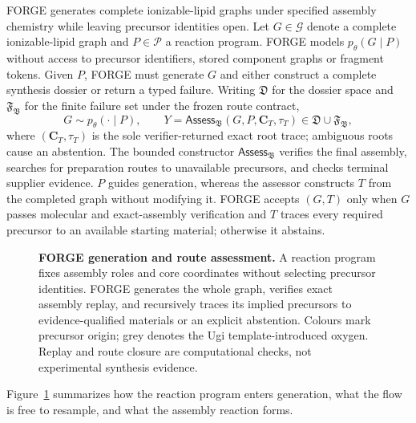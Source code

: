 \documentclass{article}
\begin{document}
FORGE generates complete ionizable-lipid graphs under specified assembly chemistry while leaving
precursor identities open. Let $G\in\mathcal{G}$ denote a complete ionizable-lipid graph and
$P\in\mathcal{P}$ a reaction program. FORGE models $p_\theta(G\mid P)$ without access to precursor
identifiers, stored component graphs or fragment tokens. Given $P$, FORGE must generate $G$ and
either construct a complete synthesis dossier or return a typed failure. Writing $\mathfrak D$ for
the dossier space and $\mathfrak F_{\mathfrak B}$ for the finite failure set under the frozen route
contract,
\begin{equation}
    G\sim p_\theta(\cdot\mid P),
    \qquad
    Y=\mathsf{Assess}_{\mathfrak B}(G,P,\mathbf C_T,\tau_T)
    \in\mathfrak D\cup\mathfrak F_{\mathfrak B},
\end{equation}
where $(\mathbf C_T,\tau_T)$ is the sole verifier-returned exact root trace; ambiguous roots cause
an abstention. The bounded constructor $\mathsf{Assess}_{\mathfrak B}$ verifies the final
assembly, searches for preparation routes to unavailable precursors, and checks terminal supplier
evidence. $P$ guides generation, whereas the assessor constructs $T$ from the completed graph without
modifying it. FORGE accepts $(G,T)$ only when $G$
passes molecular and exact-assembly verification and $T$ traces every required precursor to an
available starting material; otherwise it abstains.

\begin{figure}[t]
\centering
\resizebox{\textwidth}{!}{}
\caption{\textbf{FORGE generation and route assessment.}
A reaction program fixes assembly roles and core coordinates without selecting precursor identities.
FORGE generates the whole graph, verifies exact assembly replay, and recursively traces its implied
precursors to evidence-qualified materials or an explicit abstention. Colours mark precursor origin;
grey denotes the Ugi template-introduced oxygen. Replay and route closure are computational checks,
not experimental synthesis evidence.}
\label{fig:forge-overview}
\end{figure}

Figure~\ref{fig:forge-overview} summarizes how the reaction program enters generation,
what the flow is free to resample, and what the assembly reaction forms.
\end{document}
